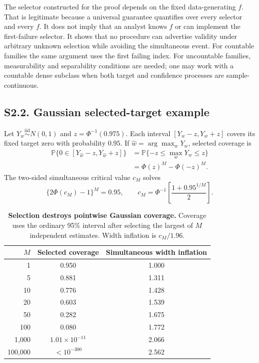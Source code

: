 \documentclass[10pt,twocolumn]{article}
\newcommand{\Prb}{\mathbb{P}}
\begin{document}
The selector constructed for the proof depends on the fixed data-generating $f$. That is legitimate because a universal guarantee quantifies over every selector and every $f$. It does not imply that an analyst knows $f$ or can implement the first-failure selector. It shows that no procedure can advertise validity under arbitrary unknown selection while avoiding the simultaneous event. For countable families the same argument uses the first failing index. For uncountable families, measurability and separability conditions are needed; one may work with a countable dense subclass when both target and confidence processes are sample-continuous.

\subsection*{S2.2. Gaussian selected-target example}

Let $Y_w\stackrel{\mathrm{iid}}\sim N(0,1)$ and $z=\Phi^{-1}(0.975)$. Each interval $[Y_w-z,Y_w+z]$ covers its fixed target zero with probability $0.95$. If $\widehat w=\arg\max_wY_w$, selected coverage is
\begin{align}
\Prb\{0\in[Y_{\widehat w}-z,Y_{\widehat w}+z]\}
&=\Prb\{-z\le\max_wY_w\le z\}\nonumber\\
&=\Phi(z)^M-\Phi(-z)^M.
\label{si:eq:selected-normal}
\end{align}
The two-sided simultaneous critical value $c_M$ solves
\begin{equation}
\{2\Phi(c_M)-1\}^M=0.95,
\qquad
c_M=\Phi^{-1}\!\left[\frac{1+0.95^{1/M}}2\right].
\label{si:eq:sim-critical}
\end{equation}

\begin{table}[h]
\centering
\caption{\textbf{Selection destroys pointwise Gaussian coverage.} Coverage uses the ordinary 95\% interval after selecting the largest of $M$ independent estimates. Width inflation is $c_M/1.96$.}
\label{si:tab:gaussian}
\begin{tabular}{rcc}
\toprule
$M$ & Selected coverage & Simultaneous width inflation \\
\midrule
1 & 0.950 & 1.000 \\
5 & 0.881 & 1.311 \\
10 & 0.776 & 1.428 \\
20 & 0.603 & 1.539 \\
50 & 0.282 & 1.675 \\
100 & 0.080 & 1.772 \\
1,000 & $1.01\times10^{-11}$ & 2.066 \\
100,000 & $<10^{-300}$ & 2.562 \\
\bottomrule
\end{tabular}
\end{table}
\end{document}
